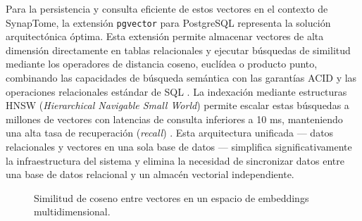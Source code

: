 Para la persistencia y consulta eficiente de estos vectores en el contexto de SynapTome, 
la extensión \texttt{pgvector} para PostgreSQL representa la solución arquitectónica 
óptima. Esta extensión permite almacenar vectores de alta dimensión directamente en 
tablas relacionales y ejecutar búsquedas de similitud mediante los operadores de 
distancia coseno, euclídea o producto punto, combinando las capacidades de búsqueda 
semántica con las garantías ACID y las operaciones relacionales estándar de SQL 
\parencite{Afian2025}. La indexación mediante estructuras HNSW 
(\textit{Hierarchical Navigable Small World}) permite escalar estas búsquedas a 
millones de vectores con latencias de consulta inferiores a 10 ms, manteniendo una 
alta tasa de recuperación (\textit{recall}) \parencite{Upadhyay2026}. Esta arquitectura 
unificada — datos relacionales y vectores en una sola base de datos — simplifica 
significativamente la infraestructura del sistema y elimina la necesidad de sincronizar 
datos entre una base de datos relacional y un almacén vectorial independiente.

\begin{figure}[H]
    \centering
    \caption{Similitud de coseno entre vectores en un espacio de embeddings multidimensional.}
    \label{fig:cosine_similarity_embeddings}
\end{figure}

